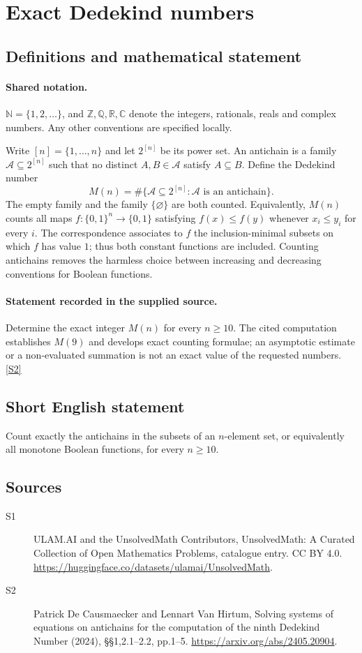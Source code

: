 \documentclass[11pt]{article}
\newcommand{\sref}[2]{\hyperlink{source:#1:#2}{[S#2]}}
\begin{document}
\section{Exact Dedekind numbers}\label{statement}

\subsection{Definitions and mathematical statement}

\paragraph{Shared notation.}$\mathbb N=\{1,2,\ldots\}$, and $\mathbb Z,\mathbb Q,\mathbb R,\mathbb C$ denote the integers, rationals, reals and complex numbers. Any other conventions are specified locally.


Write $[n]=\{1,\ldots,n\}$ and let $2^{[n]}$ be its power set. An antichain is a family $\mathcal A\subseteq2^{[n]}$ such that no distinct $A,B\in\mathcal A$ satisfy $A\subseteq B$. Define the Dedekind number
\[
M(n)=\#\{\mathcal A\subseteq2^{[n]}:\mathcal A\text{ is an antichain}\}.
\]
The empty family and the family $\{\varnothing\}$ are both counted. Equivalently, $M(n)$ counts all maps $f:\{0,1\}^n\to\{0,1\}$ satisfying $f(x)\le f(y)$ whenever $x_i\le y_i$ for every $i$. The correspondence associates to $f$ the inclusion-minimal subsets on which $f$ has value $1$; thus both constant functions are included. Counting antichains removes the harmless choice between increasing and decreasing conventions for Boolean functions.
\paragraph{Statement recorded in the supplied source.}
Determine the exact integer $M(n)$ for every $n\ge10$. The cited computation establishes $M(9)$ and develops exact counting formulae; an asymptotic estimate or a non-evaluated summation is not an exact value of the requested numbers. \sref{statement}{2}
\subsection{Short English statement}
Count exactly the antichains in the subsets of an $n$-element set, or equivalently all monotone Boolean functions, for every $n\ge10$.
\subsection{Sources}
\begin{description}
\item[\hypertarget{source:statement:1}{S1}] ULAM.AI and the UnsolvedMath Contributors, UnsolvedMath: A Curated Collection of Open Mathematics Problems, catalogue entry. CC BY 4.0. \url{https://huggingface.co/datasets/ulamai/UnsolvedMath}.
\item[\hypertarget{source:statement:2}{S2}] Patrick De Causmaecker and Lennart Van Hirtum, Solving systems of equations on antichains for the computation of the ninth Dedekind Number (2024), §§1,2.1–2.2, pp.1–5. \url{https://arxiv.org/abs/2405.20904}.
\end{description}
\label{end:statement}
\end{document}
